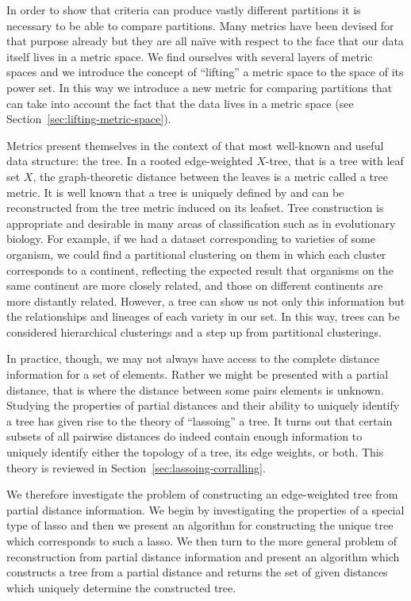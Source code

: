 In order to show that criteria can produce vastly different partitions it is
necessary to be able to compare partitions.  Many metrics have been devised
for that purpose already but they are all naïve with respect to the face that
our data itself lives in a metric space.  We find ourselves with several
layers of metric spaces and we introduce the concept of ``lifting'' a metric
space to the space of its power set.  In this way we introduce a new metric
for comparing partitions that can take into account the fact that the data
lives in a metric space (see Section~\ref{sec:lifting-metric-space}).

Metrics present themselves in the context of that most well-known and useful
data structure: the tree.  In a rooted edge-weighted $X$-tree, that is a tree
with leaf set $X$, the graph-theoretic distance between the leaves is a metric
called a tree metric.  It is well known that a tree is uniquely defined by and
can be reconstructed from the tree metric induced on its leafset.  Tree
construction is appropriate and desirable in many areas of classification such
as in evolutionary biology.  For example, if we had a dataset corresponding to
varieties of some organism, we could find a partitional clustering on them in
which each cluster corresponds to a continent, reflecting the expected result
that organisms on the same continent are more closely related, and those on
different continents are more distantly related.  However, a tree can show us
not only this information but the relationships and lineages of each variety
in our set.  In this way, trees can be considered hierarchical clusterings and
a step up from partitional clusterings.

In practice, though, we may not always have access to the complete distance
information for a set of elements.  Rather we might be presented with a
partial distance, that is where the distance between some pairs elements is
unknown.  Studying the properties of partial distances and their ability to
uniquely identify a tree has given rise to the theory of ``lassoing'' a tree.
It turns out that certain subsets of all pairwise distances do indeed contain
enough information to uniquely identify either the topology of a tree, its
edge weights, or both.  This theory is reviewed in
Section~\ref{sec:lassoing-corralling}.

We therefore investigate the problem of constructing an edge-weighted tree
from partial distance information.  We begin by investigating the properties
of a special type of lasso and then we present an algorithm for constructing
the unique tree which corresponds to such a lasso.  We then turn to the more
general problem of reconstruction from partial distance information and
present an algorithm which constructs a tree from a partial distance and
returns the set of given distances which uniquely determine the constructed
tree.

